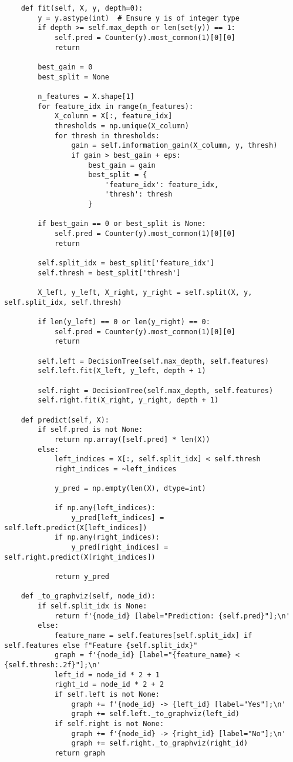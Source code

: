 \documentclass{article}
\begin{document}
\begin{enumerate}
\begin{verbatim}
    def fit(self, X, y, depth=0):
        y = y.astype(int)  # Ensure y is of integer type
        if depth >= self.max_depth or len(set(y)) == 1:
            self.pred = Counter(y).most_common(1)[0][0]
            return

        best_gain = 0
        best_split = None

        n_features = X.shape[1]
        for feature_idx in range(n_features):
            X_column = X[:, feature_idx]
            thresholds = np.unique(X_column)
            for thresh in thresholds:
                gain = self.information_gain(X_column, y, thresh)
                if gain > best_gain + eps:
                    best_gain = gain
                    best_split = {
                        'feature_idx': feature_idx,
                        'thresh': thresh
                    }

        if best_gain == 0 or best_split is None:
            self.pred = Counter(y).most_common(1)[0][0]
            return

        self.split_idx = best_split['feature_idx']
        self.thresh = best_split['thresh']

        X_left, y_left, X_right, y_right = self.split(X, y, self.split_idx, self.thresh)

        if len(y_left) == 0 or len(y_right) == 0:
            self.pred = Counter(y).most_common(1)[0][0]
            return

        self.left = DecisionTree(self.max_depth, self.features)
        self.left.fit(X_left, y_left, depth + 1)

        self.right = DecisionTree(self.max_depth, self.features)
        self.right.fit(X_right, y_right, depth + 1)

    def predict(self, X):
        if self.pred is not None:
            return np.array([self.pred] * len(X))
        else:
            left_indices = X[:, self.split_idx] < self.thresh
            right_indices = ~left_indices

            y_pred = np.empty(len(X), dtype=int)

            if np.any(left_indices):
                y_pred[left_indices] = self.left.predict(X[left_indices])
            if np.any(right_indices):
                y_pred[right_indices] = self.right.predict(X[right_indices])

            return y_pred

    def _to_graphviz(self, node_id):
        if self.split_idx is None:
            return f'{node_id} [label="Prediction: {self.pred}"];\n'
        else:
            feature_name = self.features[self.split_idx] if self.features else f"Feature {self.split_idx}"
            graph = f'{node_id} [label="{feature_name} < {self.thresh:.2f}"];\n'
            left_id = node_id * 2 + 1
            right_id = node_id * 2 + 2
            if self.left is not None:
                graph += f'{node_id} -> {left_id} [label="Yes"];\n'
                graph += self.left._to_graphviz(left_id)
            if self.right is not None:
                graph += f'{node_id} -> {right_id} [label="No"];\n'
                graph += self.right._to_graphviz(right_id)
            return graph


\end{verbatim}
\end{enumerate}
\end{document}

